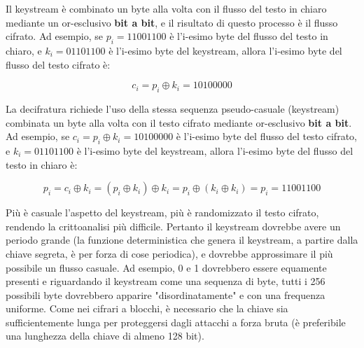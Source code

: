 Il keystream è combinato un byte alla volta con il flusso del testo in chiaro mediante un or-esclusivo \textbf{bit a bit}, e il risultato di questo processo è il flusso cifrato. Ad esempio, se $p_{i} = 11001100$ è l'i-esimo byte del flusso del testo in chiaro, e $k_{i} = 01101100$ è l'i-esimo byte del keystream, allora l'i-esimo byte del flusso del testo cifrato è:

\[
c_{i} = p_{i} \oplus k_{i} = 10100000
\]

La decifratura richiede l'uso della stessa sequenza pseudo-casuale (keystream) combinata un byte alla volta con il testo cifrato mediante or-esclusivo \textbf{bit a bit}. Ad esempio, se $c_{i} = p_{i} \oplus k_{i} = 10100000$ è l’i-esimo byte del flusso del testo cifrato, e $k_{i} = 01101100$ è l'i-esimo byte del keystream, allora l'i-esimo byte del flusso del testo in chiaro è: 

\[
p_{i} = c_{i} \oplus k_{i} = (p_{i} \oplus k_{i}) \oplus k_{i} = p_{i} \oplus (k_{i} \oplus k_{i}) = p_{i} = 11001100
\]

Più è casuale l'aspetto del keystream, più è randomizzato il testo cifrato, rendendo la crittoanalisi più difficile. Pertanto il keystream dovrebbe avere un periodo grande (la funzione deterministica che genera il keystream, a partire dalla chiave segreta, è per forza di cose periodica), e dovrebbe approssimare il più possibile un flusso casuale. Ad esempio, 0 e 1 dovrebbero essere equamente presenti e riguardando il keystream come una sequenza di byte, tutti i 256 possibili byte dovrebbero apparire "disordinatamente" e con una frequenza uniforme. Come nei cifrari a blocchi, è necessario che la chiave sia sufficientemente lunga per proteggersi dagli attacchi a forza bruta (è preferibile una lunghezza della chiave di almeno 128 bit).

